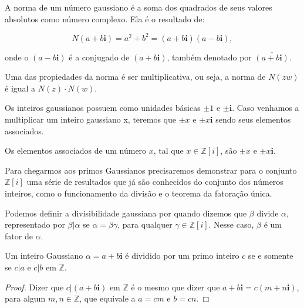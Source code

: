\begin{Df}
A norma de um n\'umero gaussiano \'e a soma dos quadrados de seus valores absolutos como n\'umero complexo. Ela \'e o resultado de:

$$N(a+b\textbf{i}) = a^2 + b^2 = (a+b\textbf{i})(a-b\textbf{i}),$$

onde o $(a-b\textbf{i})$ \'e a conjugado de $(a+b\textbf{i})$, tamb\'em denotado por $\overline{(a+b\textbf{i})}$.
\end{Df}

Uma das propiedades da norma \'e ser multiplicativa, ou seja, a norma de $N(zw)$ \'e igual a $N(z) \cdot N(w)$.

Os inteiros gaussianos possuem como unidades b\'asicas $\pm 1$ e $\pm \textbf{i}$. Caso venhamos a multiplicar um inteiro gaussiano x, teremos que $\pm x$ e $\pm x\textbf{i}$ sendo seus elementos associados.

\begin{Df}

Os elementos associados de um n\'umero $x$, tal que $x \in \mathbb{Z}[i]$, s\~ao $\pm x$ e $\pm x\textbf{i}$.

\end{Df}

Para chegarmos aos primos Gaussianos precisaremos demonstrar para o conjunto $\mathbb{Z}[i]$ uma s\'erie de resultados que j\'a s\~ao conhecidos do conjunto dos n\'umeros inteiros, como o funcionamento da divis\~ao e o teorema da fatora\c{c}\~ao \'unica.

Podemos definir a divisibilidade gaussiana por quando dizemos que $\beta$ divide $\alpha$, representado por $\beta | \alpha$ se $\alpha = \beta \gamma$, para qualquer $\gamma \in \mathbb{Z}[i] $. Nesse caso, $\beta$ \'e um fator de $\alpha$.

\begin{Th}\label{div_gaussiana1}

Um inteiro Gaussiano $\alpha = a+b\textbf{i}$ \'e dividido por um primo inteiro $c$ se e somente se $c|a$ e $c|b$ em $\mathbb{Z}$.

\end{Th}

\begin{proof}

Dizer que $c|(a+b\textbf{i})$ em $\mathbb{Z}$ \'e o mesmo que dizer que $a+b\textbf{i} = c(m +  n\textbf{i})$, para algum $m, n \in \mathbb{Z}$, que equivale a $a=cm$ e $b=cn$.

\end{proof}

